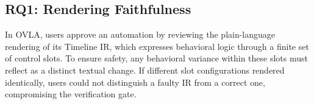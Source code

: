 \documentclass[sigconf,nonacm,anonymous,review]{acmart}
\begin{document}
\subsection{RQ1: Rendering Faithfulness}

In OVLA, users approve an automation by reviewing the plain-language rendering of its Timeline IR, which expresses behavioral logic through a finite set of control slots. To ensure safety, any behavioral variance within these slots must reflect as a distinct textual change. If different slot configurations rendered identically, users could not distinguish a faulty IR from a correct one, compromising the verification gate.
\end{document}

